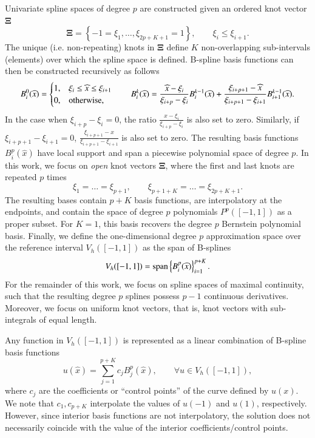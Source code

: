 \documentclass[preprint,10pt]{elsarticle}
\newcommand{\LRc}[1]{\left\{ #1 \right\}}
\newcommand{\reviewerOne}[1]{#1}
\begin{document}
Univariate spline spaces of degree $p$ are constructed given an ordered knot vector $\bm{\Xi}$ 
\[
\bm{\Xi} = \LRc{-1 = \xi_1,\ldots,\xi_{{2p}+K+1} = 1}, \qquad \xi_i \leq \xi_{i+1}.  
\]
The unique (i.e. non-repeating) knots in $\bm{\Xi}$ define $K$ non-overlapping sub-intervals (elements) over which the spline space is defined.  B-spline basis functions can then be constructed recursively as follows
\[
B^0_i(\widehat{x}) = \begin{cases}
1, & \xi_i \leq \widehat{x} \leq \xi_{i+1}\\
0, & {\rm otherwise},
\end{cases}
\qquad 
B^k_i(\widehat{x}) = \frac{\widehat{x} - \xi_i}{\xi_{i+p}-\xi_i}B^{k-1}_i(\widehat{x}) + \frac{\xi_{i+p+1}-\widehat{x}}{\xi_{i+p+1}-\xi_{i+1}}B^{k-1}_{i+1}(\widehat{x}).
\]
In the case when $\xi_{i+p}-\xi_i = 0$, the ratio $\frac{\widehat{x} - \xi_i}{\xi_{i+p}-\xi_i}$ is also set to zero.  Similarly, if $\xi_{i+p+1}-\xi_{i+1} = 0$, $ \frac{\xi_{i+p+1}-\widehat{x}}{\xi_{i+p+1}-\xi_{i+1}}$ is also set to zero.  The resulting basis functions $B^p_i(\widehat{x})$ have local support and span a piecewise polynomial space of degree $p$.  In this work, we focus on \textit{open} knot vectors $\bm{\Xi}$, where the first and last knots are repeated $p$ times
\[
\xi_1 = \ldots = \xi_{p+1}, \qquad \xi_{p+1 + K} = \ldots = \xi_{2p+K+1}.
\]
The resulting bases contain $p+K$ basis functions, are interpolatory at the endpoints, and contain the space of degree $p$ polynomials $P^p([-1,1])$ as a proper subset.  For $K=1$, this basis recovers the degree $p$ Bernstein polynomial basis.  Finally, we define the one-dimensional degree $p$ approximation space over the reference interval $V_h([-1,1])$ as the span of B-splines 
\[
V_h([-1,1]) = {\rm span}\LRc{B^p_i(\widehat{x})}_{i=1}^{p+K}.
\]
For the remainder of this work, we focus on spline spaces of maximal continuity, such that the resulting degree $p$ splines possess $p-1$ continuous derivatives.  {\color{forestgreen} Moreover, we focus on uniform knot vectors, that is, knot vectors with sub-integrals of equal length.} %

\reviewerOne{Any function in $V_h([-1,1])$ is represented as a linear combination of B-spline basis functions
\[
u(\hat{x}) = \sum_{j=1}^{p+K} c_j B^p_j(\hat{x}), \qquad \forall u \in V_h([-1,1]),
\]
where $c_j$ are the coefficients or ``control points'' of the curve defined by $u(x)$.  We note that $c_1, c_{p+K}$ interpolate the values of $u(-1)$ and $u(1)$, respectively.  However, since interior basis functions are not interpolatory, the solution does not necessarily coincide with the value of the interior coefficients/control points. }
\end{document}
